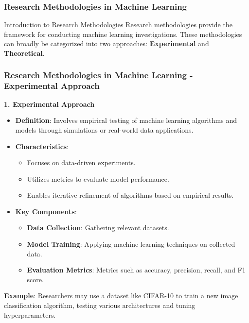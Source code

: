 \documentclass[aspectratio=169]{beamer}
\begin{document}
\begin{frame}[fragile]
    \frametitle{Research Methodologies in Machine Learning}
    
    \begin{block}{Introduction to Research Methodologies}
        Research methodologies provide the framework for conducting machine learning investigations. These methodologies can broadly be categorized into two approaches: 
        \textbf{Experimental} and \textbf{Theoretical}.
    \end{block}
\end{frame}

\begin{frame}[fragile]
    \frametitle{Research Methodologies in Machine Learning - Experimental Approach}

    \textbf{1. Experimental Approach}
    \begin{itemize}
        \item \textbf{Definition}: Involves empirical testing of machine learning algorithms and models through simulations or real-world data applications.
        \item \textbf{Characteristics}:
            \begin{itemize}
                \item Focuses on data-driven experiments.
                \item Utilizes metrics to evaluate model performance.
                \item Enables iterative refinement of algorithms based on empirical results.
            \end{itemize}
        \item \textbf{Key Components}:
            \begin{itemize}
                \item \textbf{Data Collection}: Gathering relevant datasets.
                \item \textbf{Model Training}: Applying machine learning techniques on collected data.
                \item \textbf{Evaluation Metrics}: Metrics such as accuracy, precision, recall, and F1 score.
            \end{itemize}
    \end{itemize}
    
    \textbf{Example}: Researchers may use a dataset like CIFAR-10 to train a new image classification algorithm, testing various architectures and tuning hyperparameters.

\end{frame}
\end{document}
